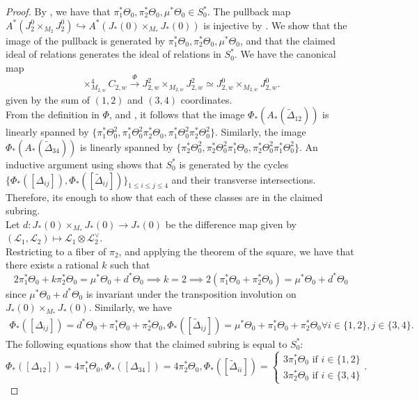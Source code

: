\documentclass[11pt]{amsart}
\numberwithin{theorem}{section}
\numberwithin{lemma}{section}
\theoremstyle{definition}
\newcommand{\ri}{\rightarrow}
\newcommand{\T}{\Theta}
\newcommand{\lb}{\mathcal{L}}
\newcommand{\hr}{\hookrightarrow}
\begin{document}
\begin{proof}
	By \cite[Theorem 3.3]{shubham-r2}, we have that $\pi_1^*\T_0,\pi_2^*\T_0,\mu^*\T_0\in S_{0}^*$.
The pullback map $A^*(J^0_2\times_{M_2}J^{0}_2)\hr A^*(J_*(0)\times_{M_*}J_*(0))$ is injective by \cite[Remark 2.2]{vakil}.
We show that the image of the pullback is generated by $\pi_1^*\T_0,\pi_2^*\T_0,\mu^*\T_0$, and that the claimed ideal of relations generates the ideal of relations in $S^*_0$.
We have the canonical map 
$$\times_{M_{2,w}}^4C_{2,w}\xrightarrow{\Phi} J^2_{2,w}\times_{M_{2,w}}J^2_{2,w}\simeq J^0_{2,w}\times_{M_{2,w}}J^0_{2,w}.$$
given by the sum of $(1,2)$ and $(3,4)$ coordinates.\\
From the definition in $\Phi$, and \cite[Theorem 3.3]{shubham-r2}, it follows that the image $\Phi_*(A_*(\tilde{\Delta}_{12}))$ is linearly spanned by $\{\pi_1^*\T_0^2,\pi_1^*\T_0^2\pi_2^*\T_0,\pi_1^*\T_0^2\pi_2^*\T_0^2\}$.
Similarly, the image $\Phi_*(A_*(\tilde{\Delta}_{34}))$ is linearly spanned by $\{\pi_2^*\T_0^2,\pi_2^*\T_0^2\pi_1^*\T_0,\pi_2^*\T_0^2\pi_1^*\T_0^2\}$. An inductive argument using \cite[Lemma 4.7 and Theorem 4.4]{shubham-r2} shows that $S_0^*$ is generated by the cycles $\{\Phi_*([\Delta_{ij}]),\Phi_*([\tilde{\Delta}_{ij}])\}_{1\leq i\leq j\leq 4}$ and their transverse intersections. Therefore, its enough to show that each of these classes are in the claimed subring.\\
Let $d: J_*(0)\times_{M_*}J_*(0)\ri J_*(0)$ be the difference map given by $(\lb_1,\lb_2)\mapsto \lb_1\otimes\lb_2^\vee$.\\
Restricting to a fiber of $\pi_2$, and applying the theorem of the square, we have that there exists a rational $k$ such that 
\begin{equation}\label{eq:mu,d}
2\pi_1^*\T_0+k\pi_2^*\T_0 = \mu^*\T_0+d^*\T_0\implies k=2\implies 2(\pi_1^*\T_0+\pi_2^*\T_0) = \mu^*\T_0+d^*\T_0
\end{equation}
since $\mu^*\T_0+d^*\T_0$ is invariant under the transposition involution on $J_*(0)\times_{M_*}J_*(0)$.
Similarly, we have 
\begin{gather*}\Phi_*([\Delta_{ij}]) = d^*\T_0+\pi_1^*\T_0+\pi_2^*\T_0,
\Phi_*([\tilde{\Delta}_{ij}])= \mu^*\T_0+\pi_1^*\T_0+\pi_2^*\T_0\forall i\in \{1,2\},j\in\{3,4\}.\end{gather*}
The following equations show that the claimed subring is equal to $S_0^*$:
$$\Phi_*([\Delta_{12}]) = 4\pi_1^*\T_0,\Phi_*([\Delta_{34}]) = 4\pi_2^*\T_0,\Phi_*([\tilde{\Delta}_{ii}]) = \begin{cases}3\pi_1^*\T_0 \text{ if }i\in\{1,2\}\\3\pi_2^*\T_0\text{ if }i\in \{3,4\}\end{cases}.$$

\end{proof}
\end{document}
